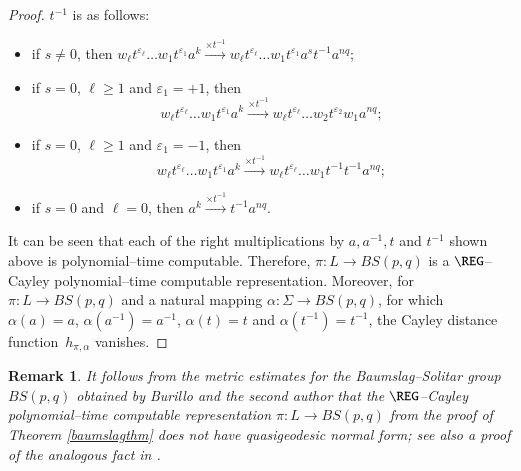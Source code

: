 \documentclass[article,12pt]{elsarticle}
\newtheorem{remark}{Remark}
\newcommand\distfun{Cayley distance function}
\begin{document}
\begin{proof}
 	$t^{-1}$ is as follows: 
 	\begin{itemize} 
 		\item{if $s \neq 0$, then 
 			$w_\ell t^{\varepsilon_\ell} \dots 
 			w_1 t^{\varepsilon_1}a^k \xrightarrow{\times t^{-1}} w_\ell t^{\varepsilon_\ell} \dots 
 			w_1 t^{\varepsilon_1} a^s t^{-1} a^{nq}$;}	
 		\item{if $s=0$, $\ell \geqslant 1$ and 
 			$\varepsilon_1 = +1$, then 
 			$$w_\ell t^{\varepsilon_\ell} \dots 
 			w_1 t^{\varepsilon_1} a^k \xrightarrow{\times 
 				t^{-1}}
 			w_\ell t^{\varepsilon_\ell} \dots 
 			w_2 t^{\varepsilon_2} w_1 a^{nq};$$}
 		\item{if $s=0$, $\ell \geqslant 1$ and $\varepsilon_1 = -1$, then $$w_\ell t^{\varepsilon_\ell} \dots 
 			w_1 t^{\varepsilon_1}a^k \xrightarrow{\times 
 				t^{-1}} w_\ell t^{\varepsilon_\ell} \dots
 			w_1 t^{-1}t^{-1} a^{nq};$$}  
 		\item{if $s=0$ and $\ell = 0$, then $a^k 
 			\xrightarrow{\times t^{-1}} t^{-1} a^{nq}$.}  
 	\end{itemize}	
 	It can be seen that each of the right multiplications 
 	by $a,a^{-1},t$ and $t^{-1}$ shown above 
    is polynomial--time computable. 	
 	Therefore, $\pi : L \rightarrow BS(p,q) $ is 
 	a $\REG$--Cayley polynomial--time computable 
 	representation. Moreover, for  
 	$\pi: L \rightarrow BS(p,q)$ and a natural mapping 
 	$\alpha: \Sigma \rightarrow BS(p,q)$, for 
 	which $\alpha(a) = a$, $\alpha(a^{-1}) = a^{-1}$, 
 	$\alpha (t) = t$ and $\alpha(t^{-1})=t^{-1}$, 
 	the \distfun\ $h_{\pi,\alpha}$ 
 	vanishes.
 \end{proof} 
 \begin{remark}	
 	It follows from the metric 
 	estimates for the Baumslag--Solitar group 
 	$BS(p,q)$ obtained by
 	Burillo and the second author \cite{BurilloElder14} 
 	that the 
 	$\REG$--Cayley polynomial--time 
 	computable representation
 	$\pi : L \rightarrow BS(p,q)$ from the  
 	proof of Theorem \ref{baumslagthm}
 	does not have quasigeodesic normal form; 
 	see also a proof of the analogous fact  in \cite[p.~317]{ElderTabackCgraph}.  	
 \end{remark} 

 
\end{document}
